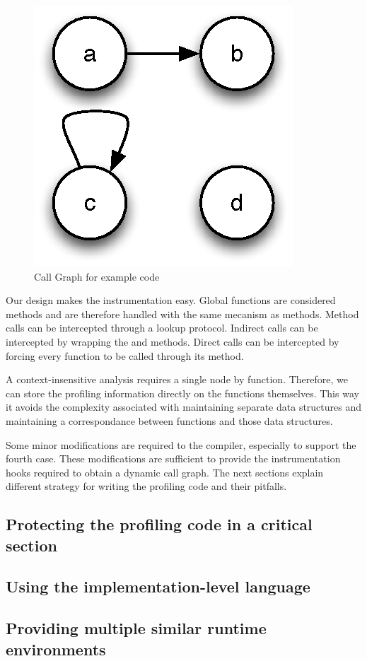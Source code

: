 \begin{figure}[htb]
\begin{center}
\includegraphics{figures/callgraph}
\caption{\label{fig:CallGraph} Call Graph for example code}
\end{center}
\end{figure}

Our design makes the instrumentation easy. Global functions are considered
methods and are therefore handled with the same mecanism as methods. Method
calls can be intercepted through a lookup protocol. Indirect calls can be
intercepted by wrapping the  and  methods. Direct calls can
be intercepted by forcing every function to be called through its 
method.

A context-insensitive analysis requires a single node by function. Therefore,
we can store the profiling information directly on the functions themselves.
This way it avoids the complexity associated with maintaining separate data
structures and maintaining a correspondance between functions and those data
structures.

Some minor modifications are required to the compiler, especially to support
the fourth case. These modifications are sufficient to provide the
instrumentation hooks required to obtain a dynamic call graph. The next
sections explain different strategy for writing the profiling code and their
pitfalls.

\subsection{Protecting the profiling code in a critical section} 

\subsection{Using the implementation-level language}

\subsection{Providing multiple similar runtime environments}

